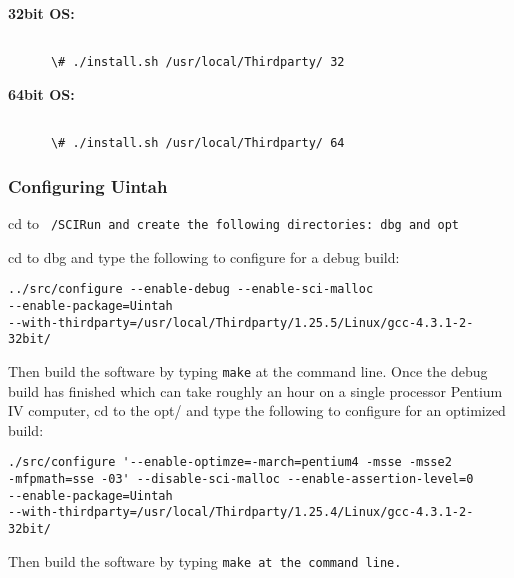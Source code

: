 \textbf{32bit OS:}

\begin{Verbatim}[fontsize=\footnotesize]

      \# ./install.sh /usr/local/Thirdparty/ 32

\end{Verbatim}

\textbf{64bit OS:}


\begin{Verbatim}[fontsize=\footnotesize]

      \# ./install.sh /usr/local/Thirdparty/ 64

\end{Verbatim}


\subsubsection{Configuring Uintah}

cd to \tt ~/SCIRun \normalfont and create the following directories: dbg and opt

cd to dbg and type the following to configure for a debug build:

\begin{Verbatim}[fontsize=\footnotesize]
../src/configure --enable-debug --enable-sci-malloc 
--enable-package=Uintah 
--with-thirdparty=/usr/local/Thirdparty/1.25.5/Linux/gcc-4.3.1-2-32bit/
\end{Verbatim}

Then build the software by typing \texttt{make} at the command
line. Once the debug build has finished which can take roughly an hour
on a single processor Pentium IV computer, cd to the opt/ and type the
following to configure for an optimized build:

\begin{Verbatim}[fontsize=\footnotesize]
./src/configure '--enable-optimze=-march=pentium4 -msse -msse2 
-mfpmath=sse -03' --disable-sci-malloc --enable-assertion-level=0 
--enable-package=Uintah 
--with-thirdparty=/usr/local/Thirdparty/1.25.4/Linux/gcc-4.3.1-2-32bit/
\end{Verbatim}

Then build the software by typing \tt make \normalfont at the command line.


